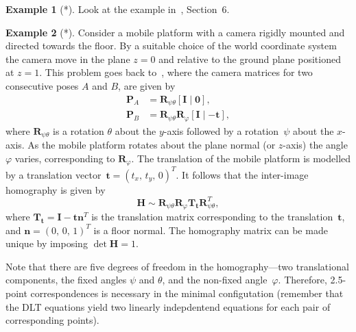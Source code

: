 \documentclass[11pt,a4paper]{article}
\theoremstyle{definition}
\newtheorem{example}{Example}
\renewcommand{\phi}{\varphi}
\newcommand{\T}{T}
\newcommand{\mat}[1]{\bm{#1}}
\begin{document}
\begin{example}[*]
Look at the example in~\cite{larsson2017cvpr}, Section~6.
\end{example}

\begin{example}[*]\label{ex:Hplanar1}
Consider a mobile platform with a camera rigidly mounted and directed towards the floor.
By a suitable choice of the
world coordinate system the camera move in the plane $z=0$ and relative to the ground plane
positioned at $z=1$. This problem goes back to~\cite{wadenback2013},
where the camera matrices for two consecutive
poses $A$ and $B$, are given by
\begin{equation}\label{paper03:eq:cammats}
\begin{aligned}
    \mat{P}_A &= \mat{R}_{\psi\theta}[\mat{I}\;|\;\mat{0}],\\
    \mat{P}_B &= \mat{R}_{\psi\theta}\mat{R}_\phi[\mat{I}\;|\;{-\mat{t}}],
\end{aligned}
\end{equation}
where $\mat{R}_{\psi\theta}$ is a rotation $\theta$ about the $y$-axis followed by
a rotation~$\psi$ about the $x$-axis. As the mobile platform rotates about the
plane normal (or $z$-axis) the angle $\phi$ varies, corresponding to $\mat{R}_\phi$.
The translation of the mobile platform is modelled by a translation vector~$\mat{t}=(t_x,\,t_y,\,0)^{\T}$.
It follows that the inter-image homography is given by
\begin{equation}\label{eq:Hplanar}
    \mat{H} \sim \mat{R}_{\psi\theta}\mat{R}_{\phi}\mat{T}_{\mat{t}}\mat{R}_{\psi\theta}^{\T},
\end{equation}
where $\mat{T}_{\mat{t}}=\mat{I}-\mat{tn}^{\T}$ is the translation matrix corresponding
to the translation~$\mat{t}$, and $\mat{n}=(0,\,0,\,1)^{\T}$ is a floor normal.
The homography matrix can be made unique by imposing $\det{\mat{H}}=1$.

Note that there are five degrees of freedom in the homography---two translational components,
the fixed angles $\psi$ and $\theta$, and the non-fixed angle~$\phi$. Therefore, 2.5-point
correspondences is necessary in the minimal configutation (remember that the DLT equations yield
two linearly indepdentend equations for each pair of corresponding points).


\end{example}
\end{document}
